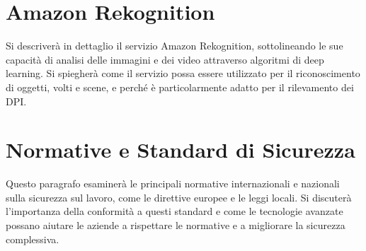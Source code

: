 \section{Amazon Rekognition}

Si descriverà in dettaglio il servizio Amazon Rekognition, sottolineando le sue capacità di analisi delle immagini e dei video attraverso algoritmi di deep learning. Si spiegherà come il servizio possa essere utilizzato per il riconoscimento di oggetti, volti e scene, e perché è particolarmente adatto per il rilevamento dei DPI.

\section{Normative e Standard di Sicurezza}

Questo paragrafo esaminerà le principali normative internazionali e nazionali sulla sicurezza sul lavoro, come le direttive europee e le leggi locali. Si discuterà l'importanza della conformità a questi standard e come le tecnologie avanzate possano aiutare le aziende a rispettare le normative e a migliorare la sicurezza complessiva.
